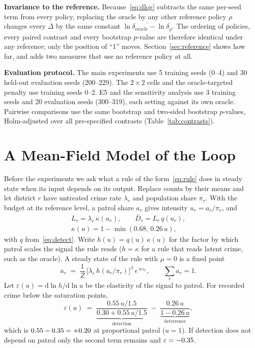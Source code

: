 \textbf{Invariance to the reference.} Because~\eqref{eq:dlog} subtracts the same
per-seed term from every policy, replacing the oracle by any other reference
policy $\rho$ changes every $\overline\Delta$ by the same constant
$\overline{\ln\delta_{\mathrm{oracle}} - \ln\delta_\rho}$. The ordering of
policies, every paired contrast and every bootstrap $p$-value are therefore
identical under any reference; only the position of ``1'' moves.
Section~\ref{sec:reference} shows how far, and adds two measures that use no
reference policy at all.

\textbf{Evaluation protocol.} The main experiments use 5 training seeds (0--4)
and 30 held-out evaluation seeds (200--229). The $2\times2$ cells and the
oracle-targeted penalty use training seeds 0--2. E5 and the sensitivity analysis
use 3 training seeds and 20 evaluation seeds (300--319), each setting against
its own oracle. Pairwise comparisons use the same bootstrap and two-sided
bootstrap $p$-values, Holm-adjusted over all \nNContrasts{} pre-specified
contrasts (Table~\ref{tab:contrasts}).

\section{A Mean-Field Model of the Loop}
\label{sec:model}

Before the experiments we ask what a rule of the form~\eqref{eq:rule} does in
steady state when its input depends on its output. Replace counts by their means
and let district $r$ have untreated crime rate $\lambda_r$ and population share
$\pi_r$. With the budget at its reference level, a patrol share $a_r$ gives
intensity $u_r = a_r/\pi_r$, and
\begin{equation}
\begin{gathered}
L_r = \lambda_r\,\kappa(u_r), \qquad \bar D_r = L_r\, q(u_r), \\
\kappa(u) = 1 - \min(0.68,\, 0.26\,u),
\end{gathered}
\end{equation}
with $q$ from~\eqref{eq:detect}. Write $h(u) = q(u)\,\kappa(u)$ for the factor by
which patrol scales the signal the rule reads ($h=\kappa$ for a rule that reads
latent crime, such as the oracle). A steady state of the rule with $\mu=0$ is a
fixed point
\begin{equation}
a_r \;=\; \frac{1}{Z}\,\big[\lambda_r\, h(a_r/\pi_r)\big]^{\beta}\, e^{\,w z_r},
\qquad \textstyle\sum_r a_r = 1 .
\label{eq:fp}
\end{equation}
Let $\varepsilon(u) = \mathrm{d}\ln h/\mathrm{d}\ln u$ be the elasticity of the
signal to patrol. For recorded crime below the saturation points,
\begin{equation}
\varepsilon(u) \;=\;
\underbrace{\frac{0.55\,u/1.5}{0.30 + 0.55\,u/1.5}}_{\text{detection}}
\;-\;
\underbrace{\frac{0.26\,u}{1 - 0.26\,u}}_{\text{deterrence}} ,
\label{eq:eps}
\end{equation}
which is $0.55 - 0.35 = +0.20$ at proportional patrol
($u=1$). If detection does not depend on patrol only the second term remains
and $\varepsilon = -0.35$.

